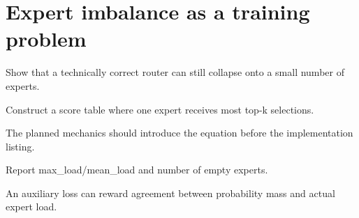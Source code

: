 \section{Expert imbalance as a training problem}
\label{sec:ch07-expert-imbalance-as-a-training-problem}

Show that a technically correct router can still collapse onto a small number of experts.



Construct a score table where one expert receives most top-k selections.



The planned mechanics should introduce the equation before the implementation listing.





\begin{checkpointbox}
Report max\_load/mean\_load and number of empty experts.
\end{checkpointbox}

An auxiliary loss can reward agreement between probability mass and actual expert load.
